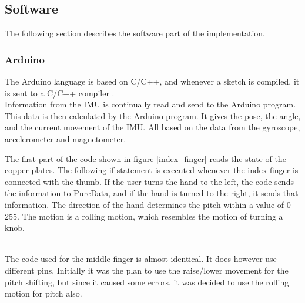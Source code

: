 
\subsection{Software}

The following section describes the software part of the implementation. 

\subsubsection{Arduino}
The Arduino language is based on C/C++, and whenever a sketch is compiled, it is sent to a C/C++ compiler \citep{Arduino_FAQ}.\\

Information from the IMU is continually read and send to the Arduino program. This data is then calculated by the Arduino program. It gives the pose, the angle, and the current movement of the IMU. All based on the data from the gyroscope, accelerometer and magnetometer.

The first part of the code shown in figure \ref{index_finger} reads the state of the copper plates. The following if-statement is executed whenever the index finger is connected with the thumb. 
If the user turns the hand to the left, the code sends the information to PureData, and if the hand is turned to the right, it sends that information. 
The direction of the hand determines the pitch within a value of 0-255. The motion is a rolling motion, which resembles the motion of turning a knob. \\


\begin{minipage}{\linewidth}%
\label{index_finger}
\end{minipage}\\

The code used for the middle finger is almost identical. It does however use different pins. Initially it was the plan to use the raise/lower movement for the pitch shifting, but since it caused some errors, it was decided to use the rolling motion for pitch also.\\

